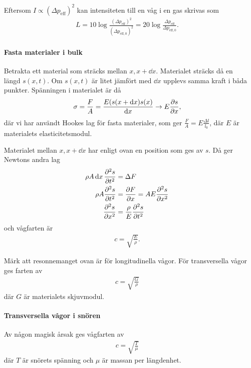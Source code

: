 Eftersom $I\propto (\Delta p_{\text{eff}})^2$ kan intensiteten till en våg i en gas skrivas som
\begin{align*}
	L = 10\log{\frac{(\Delta p_{\text{eff}})^2}{(\Delta p_{\text{eff}, 0})^2}} = 20\log{\frac{\Delta p_{\text{eff}}}{\Delta p_{\text{eff}, 0}}}.
\end{align*}

\paragraph{Fasta materialer i bulk}
Betrakta ett material som sträcks mellan $x, x + \dd{x}$. Materialet sträcks då en längd $s(x, t)$. Om $s(x, t)$ är litet jämfört med $\dd{x}$ upplevs samma kraft i båda punkter. Spänningen i materialet är då
\begin{align*}
	\sigma = \frac{F}{A} = \frac{E(s(x + \dd{x})  s(x)}{\dd{x}}\to E\pdv{s}{x},
\end{align*}
där vi har användt Hookes lag för fasta materialer, som ger $\frac{F}{A} = E\frac{\Delta l}{l_0}$, där $E$ är materialets elasticitetsmodul.

Materialet mellan $x, x + \dd{x}$ har enligt ovan en position som ges av $s$. Då ger Newtons andra lag
\begin{align*}
	\rho A\dd{x}\pdv[2]{s}{t} &= \Delta F \\
	\rho A\pdv[2]{s}{t}       &= \pdv{F}{x} = AE\pdv[2]{s}{x} \\
	\pdv[2]{s}{x}             &= \frac{\rho}{E}\pdv[2]{s}{t}
\end{align*}
och vågfarten är
\begin{align*}
	c = \sqrt{\frac{E}{\rho}}.
\end{align*}

Märk att resonnemanget ovan är för longitudinella vågor. För transversella vågor ges farten av
\begin{align*}
	c = \sqrt{\frac{G}{\rho}}
\end{align*}
där $G$ är materialets skjuvmodul.

\paragraph{Transversella vågor i snören}
Av någon magisk årsak ges vågfarten av
\begin{align*}
	c = \sqrt{\frac{T}{\mu}}
\end{align*}
där $T$ är snörets spänning och $\mu$ är massan per längdenhet.
